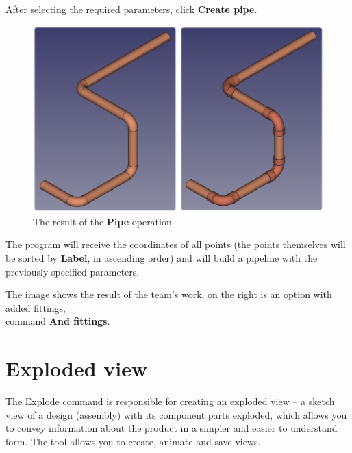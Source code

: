 \documentclass[a4paper,12pt]{article}
\begin{document}
After selecting the required parameters, click \textbf{Create pipe}.

\begin{figure}[htp]
	\centering
	\includegraphics[width=1\textwidth]{img/pipe_result.png}
	\caption{The result of the \textbf{Pipe} operation}
	\label{sec:pipe_result}
\end{figure}

The program will receive the coordinates of all points (the points themselves will be sorted by \textbf{Label}, in ascending order) and will build a pipeline with the previously specified parameters.

The image shows the result of the team's work, on the right is an option with added fittings,\\command \textbf{And fittings}.

\pagebreak




\section{Exploded view}

The \hyperref[sec:7]{Explode} command is responsible for creating an exploded view -- a sketch view of a design (assembly) with its component parts exploded, which allows you to convey information about the product in a simpler and easier to understand form. The tool allows you to create, animate and save views.
\end{document}
